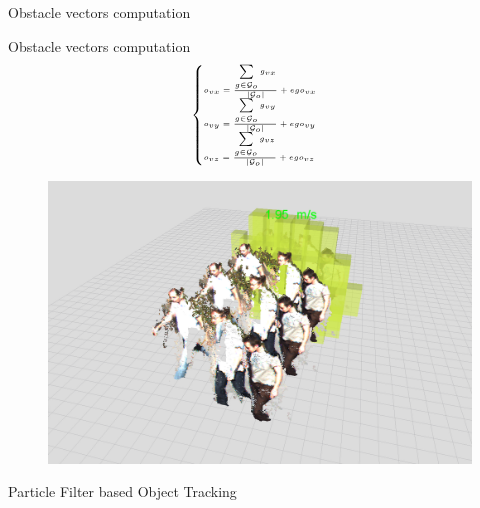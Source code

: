 \begin{frame}{Obstacle vectors computation}
  
  \begin{block}{Obstacle vectors computation}
    \begin{equation}
      \nonumber \tiny
      \begin{cases}
	o_{vx} = {{\sum\limits_{g \in \mathcal{G}_o} g_{vx}} \over {|\mathcal{G}_o|}} + ego_{vx}\\
	o_{vy} = {{\sum\limits_{g \in \mathcal{G}_o} g_{vy}} \over {|\mathcal{G}_o|}} + ego_{vy}\\
	o_{vz} = {{\sum\limits_{g \in \mathcal{G}_o} g_{vz}} \over {|\mathcal{G}_o|}} + ego_{vz}
      \end{cases}
    \end{equation}
  \end{block}
  
  \begin{figure}
    \includegraphics[height=0.5\textheight]{fakePointCloud}
  \end{figure}


  \note {
  
  }
\end{frame}

\begin{frame}{Particle Filter based Object Tracking}
  \begin{columns}
  \end{columns}
\end{frame}

